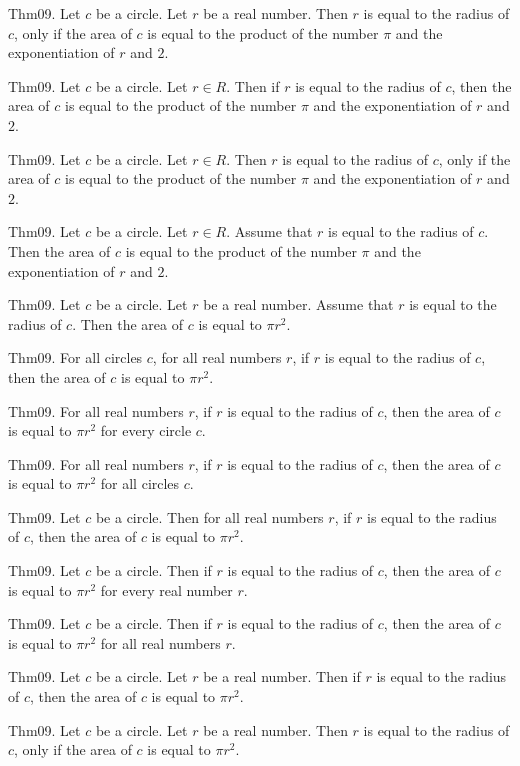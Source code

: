 \documentclass{article}
\begin{document}
Thm09. Let $c$ be a circle. Let $r$ be a real number. Then $r$ is equal to the radius of $c$, only if the area of $c$ is equal to the product of the number \(\pi\) and the exponentiation of $r$ and $2$.

Thm09. Let $c$ be a circle. Let $r \in R$. Then if $r$ is equal to the radius of $c$, then the area of $c$ is equal to the product of the number \(\pi\) and the exponentiation of $r$ and $2$.

Thm09. Let $c$ be a circle. Let $r \in R$. Then $r$ is equal to the radius of $c$, only if the area of $c$ is equal to the product of the number \(\pi\) and the exponentiation of $r$ and $2$.

Thm09. Let $c$ be a circle. Let $r \in R$. Assume that $r$ is equal to the radius of $c$. Then the area of $c$ is equal to the product of the number \(\pi\) and the exponentiation of $r$ and $2$.

Thm09. Let $c$ be a circle. Let $r$ be a real number. Assume that $r$ is equal to the radius of $c$. Then the area of $c$ is equal to $\pi r ^ {2}$.

Thm09. For all circles $c$, for all real numbers $r$, if $r$ is equal to the radius of $c$, then the area of $c$ is equal to $\pi r ^ {2}$.

Thm09. For all real numbers $r$, if $r$ is equal to the radius of $c$, then the area of $c$ is equal to $\pi r ^ {2}$ for every circle $c$.

Thm09. For all real numbers $r$, if $r$ is equal to the radius of $c$, then the area of $c$ is equal to $\pi r ^ {2}$ for all circles $c$.

Thm09. Let $c$ be a circle. Then for all real numbers $r$, if $r$ is equal to the radius of $c$, then the area of $c$ is equal to $\pi r ^ {2}$.

Thm09. Let $c$ be a circle. Then if $r$ is equal to the radius of $c$, then the area of $c$ is equal to $\pi r ^ {2}$ for every real number $r$.

Thm09. Let $c$ be a circle. Then if $r$ is equal to the radius of $c$, then the area of $c$ is equal to $\pi r ^ {2}$ for all real numbers $r$.

Thm09. Let $c$ be a circle. Let $r$ be a real number. Then if $r$ is equal to the radius of $c$, then the area of $c$ is equal to $\pi r ^ {2}$.

Thm09. Let $c$ be a circle. Let $r$ be a real number. Then $r$ is equal to the radius of $c$, only if the area of $c$ is equal to $\pi r ^ {2}$.
\end{document}
